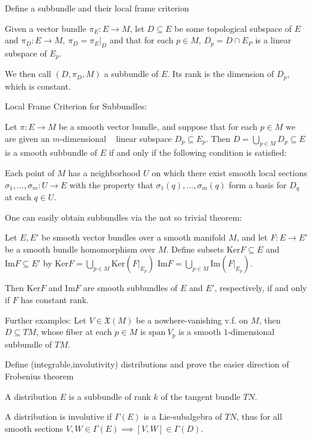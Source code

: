 Define a subbundle and their local frame criterion

Given a vector bundle \( \pi_{E} : E \to M \),
let \( D \subseteq E \) be some topological subspace of \( E \)
and \( \pi_{D} : E \to M,\ \pi_{D} = \pi_{E}|_{D}\)
and that for each \( p \in M \), \( D_p = D \cap E_P \)
is a linear subspace of \( E_p \).

We then call \( (D, \pi_{D}, M) \) a subbundle of \( E \).
Its rank is the dimension of \( D_p \), which is constant.

Local Frame Criterion for Subbundles:

Let \(\pi: E \rightarrow M\) be a smooth vector bundle, and suppose that for each \(p \in M\) we are given an \(m\)-dimensional   
linear subspace \(D_p \subseteq E_p\). 
Then \(D = \bigcup_{p \in M} D_p \subseteq E\) is a smooth subbundle of \(E\) if and only if the following condition is satisfied:

Each point of \(M\) has a neighborhood \(U\) on which there exist smooth local sections \(\sigma_1, \dots, \sigma_m: U \rightarrow E\) 
with the property that \(\sigma_1(q), \dots, \sigma_m(q)\) form a basis for \(D_q\) at each \(q \in U\).

One can easily obtain subbundles via the not so trivial theorem:

Let \(E, E'\) be smooth vector bundles over a smooth manifold \(M\), 
and let \(F: E \to E'\) be a smooth bundle homomorphism over \(M\). 
Define subsets \(\text{Ker} F \subseteq E\) and \(\text{Im} F \subseteq E'\) by
\(\text{Ker} F = \bigcup_{p \in M} \text{Ker} (F|_{E_p})\) 
\( \text{Im} F = \bigcup_{p \in M} \text{Im} (F|_{E_p}).\)

Then \(\text{Ker} F\) and \(\text{Im} F\) are smooth subbundles of \(E\) and \(E'\), 
respectively, if and only if \(F\) has constant rank.

Further examples:
Let \( V \in \mathfrak{X}(M) \) be a nowhere-vanishing v.f. on \( M \), then \( D \subseteq TM \),
whose fiber at each \( p \in M \) is \( \text{span}\ V_p \) is a smooth \( 1 \)-dimensional
subbundle of \( TM \).


Define (integrable,involutivity) distributions and 
prove the easier direction of Frobenius theorem

A distribution \( E \) is a subbundle of rank \( k \) of the tangent bundle \( TN \).

A distribution is involutive if \( \Gamma(E) \) is a Lie-subalgebra of \( TN \),
thus for all smooth sections \( V,W \in \Gamma(E) \implies [V, W] \in \Gamma(D)\).

